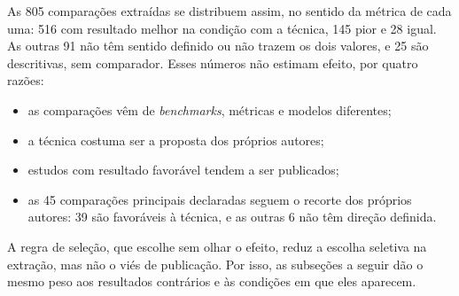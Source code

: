 As 805 comparações extraídas se distribuem assim, no sentido da métrica de cada uma: 516 com resultado melhor na
condição com a técnica, 145 pior e 28 igual. As outras 91 não têm sentido definido ou não trazem os dois valores, e
25 são descritivas, sem comparador. Esses números não estimam efeito, por quatro razões:
\begin{itemize}
  \item as comparações vêm de \textit{benchmarks}, métricas e modelos diferentes;
  \item a técnica costuma ser a proposta dos próprios autores;
  \item estudos com resultado favorável tendem a ser publicados;
  \item as 45 comparações principais declaradas seguem o recorte dos próprios autores: 39 são favoráveis à técnica,
  e as outras 6 não têm direção definida.
\end{itemize}
A regra de seleção, que escolhe sem olhar o efeito, reduz a escolha seletiva na extração, mas não o viés de
publicação. Por isso, as subseções a seguir dão o mesmo peso aos resultados contrários e às condições em que eles
aparecem.





